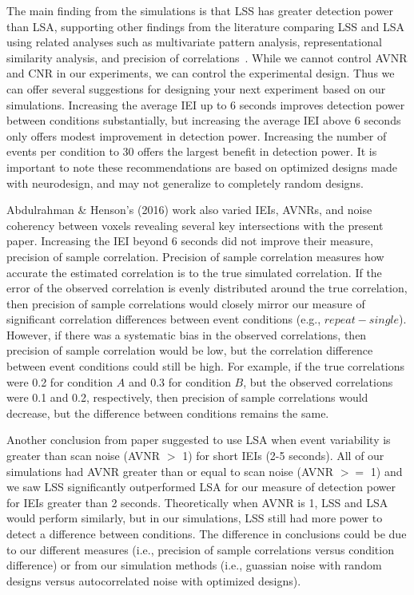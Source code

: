 \documentclass[10pt,letterpaper]{article}
\begin{document}
The main finding from the simulations is that LSS has greater detection power than LSA,
supporting other findings from the literature comparing LSS and LSA using related analyses such as
multivariate pattern analysis, representational similarity analysis, and precision of correlations~\cite{Mumford2012,Mumford2014a,Abdulrahman2016,Turner2012a}.
While we cannot control AVNR and CNR in our experiments, we can control the experimental design.
Thus we can offer several suggestions for designing your next experiment based on our simulations.
Increasing the average IEI up to 6 seconds improves detection power between conditions substantially,
but increasing the average IEI above 6 seconds only offers modest improvement in detection power.
Increasing the number of events per condition to 30 offers the largest benefit in detection power.
It is important to note these recommendations are based on optimized designs made with neurodesign,
and may not generalize to completely random designs.

Abdulrahman \& Henson's (2016) work also varied IEIs, AVNRs, and noise coherency between voxels
revealing several key intersections with the present paper.
Increasing the IEI beyond 6 seconds did not improve their measure, precision of sample correlation.
Precision of sample correlation measures how accurate the estimated correlation is to the true
simulated correlation.
If the error of the observed correlation is evenly distributed around the
true correlation, then precision of sample correlations would closely mirror our measure of
significant correlation differences between event conditions (e.g., $repeat - single$).
However, if there was a systematic bias in the observed correlations, then precision of sample correlation
would be low, but the correlation difference between event conditions could still be high.
For example, if the true correlations were 0.2 for condition $A$ and 0.3 for condition $B$, but
the observed correlations were 0.1 and 0.2, respectively, then precision of sample correlations would
decrease, but the difference between conditions remains the same.

Another conclusion from \cite[Abdulrahman \& Henson's (2016)]{Abdulrahman2016} paper suggested to
use LSA when event variability is greater than scan noise (AVNR $>$ 1) for short IEIs (2-5 seconds).
All of our simulations had AVNR greater than or equal to scan noise (AVNR $>=$ 1) and we saw
LSS significantly outperformed LSA for our measure of detection power for IEIs greater than 2 seconds.
Theoretically when AVNR is 1, LSS and LSA would perform similarly, but in our simulations,
LSS still had more power to detect a difference between conditions.
The difference in conclusions could be due to our different measures (i.e., precision of sample correlations versus condition difference)
or from our simulation methods (i.e., guassian noise with random designs versus autocorrelated noise with optimized designs).
\end{document}
